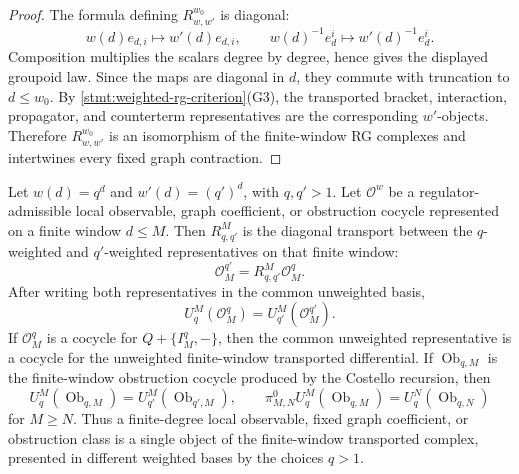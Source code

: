 \begin{proof}
  The formula defining \(R^{w_0}_{w,w'}\) is diagonal:
  \[
    w(d)e_{d,i}\mapsto w'(d)e_{d,i},\qquad
    w(d)^{-1}e^i_d\mapsto w'(d)^{-1}e^i_d .
  \]
  Composition multiplies the scalars degree by degree, hence gives the
  displayed groupoid law.  Since the maps are diagonal in \(d\), they
  commute with truncation to \(d\leq w_0\).  By
  \ref{stmt:weighted-rg-criterion}(G3), the transported bracket,
  interaction, propagator, and counterterm representatives are the
  corresponding \(w'\)-objects.  Therefore \(R^{w_0}_{w,w'}\) is an
  isomorphism of the finite-window RG complexes and intertwines every
  fixed graph contraction.
\end{proof}

\begin{thm}
\label{thm:wt-finite-degree-observables}
  Let \(w(d)=q^d\) and \(w'(d)=(q')^d\), with \(q,q'>1\).  Let
  \(\mathcal O^w\) be a regulator-admissible local observable, graph
  coefficient, or obstruction cocycle represented on a finite window
  \(d\leq M\).  Then \(R^M_{q,q'}\) is the diagonal transport between
  the \(q\)-weighted and \(q'\)-weighted representatives on that
  finite window:
  \[
    \mathcal O^{q'}_M=R^M_{q,q'}\mathcal O^q_M .
  \]
  After writing both representatives in the common unweighted basis,
  \[
    U^M_q(\mathcal O^q_M)=U^M_{q'}(\mathcal O^{q'}_M).
  \]
  If \(\mathcal O^q_M\) is a cocycle for
  \(Q+\{I^q_M,-\}\), then the common unweighted representative is a
  cocycle for the unweighted finite-window transported differential.
  If \(\operatorname{Ob}_{q,M}\) is the finite-window obstruction
  cocycle produced by the Costello recursion, then
  \[
    U^M_q(\operatorname{Ob}_{q,M})
      =U^M_{q'}(\operatorname{Ob}_{q',M}),
    \qquad
    \pi^0_{M,N}U^M_q(\operatorname{Ob}_{q,M})
      =U^N_q(\operatorname{Ob}_{q,N})
  \]
  for \(M\geq N\).  Thus a finite-degree local observable, fixed graph
  coefficient, or obstruction class is a single object of the
  finite-window transported complex, presented in different weighted
  bases by the choices \(q>1\).
\end{thm}

